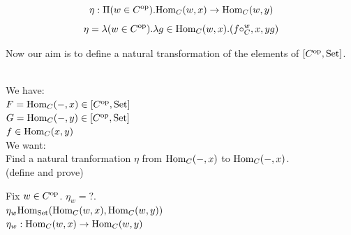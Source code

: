 \documentclass[10pt,a4paper]{article}
\begin{document}
\begin{definition}
$$\eta : \Pi(w\in C^{\textrm{op}}).{\textrm{Hom}}_C(w,x)\to {\textrm{Hom}}_C(w,y)$$
$$\eta = \lambda (w\in C^{\textrm{op}}). \lambda g\in{\textrm{Hom}}_C(w,x).(f\circ_C^w,x,y g)$$
\end{definition}
Now our aim is to define a natural transformation of the elements of $[C^{\textrm{op}},{\textrm{Set}}]$.\\
\begin{lemma}$\textrm{ }$\\
We have:\\
$F={\textrm{Hom}}_C(-,x)\in [C^{\textrm{op}},{\textrm{Set}}]$\\
$G={\textrm{Hom}}_C(-,y)\in [C^{\textrm{op}},{\textrm{Set}}]$\\
$f\in{\textrm{Hom}}_C(x,y)$\\
We want:\\
Find a natural tranformation $\eta$ from ${\textrm{Hom}}_C(-,x)$ to ${\textrm{Hom}}_C(-,x)$.\\ (define and prove)\\
\end{lemma}
Fix $w\in C^{\textrm{op}}$. $\eta_w = ?$.\\
$\eta_w{\textrm{Hom}}_{\textrm{Set}}({\textrm{Hom}}_C(w,x),{\textrm{Hom}}_C(w,y))$\\
$\eta_w: {\textrm{Hom}}_C(w,x)\to {\textrm{Hom}}_C(w,y)$\\
\end{document}
